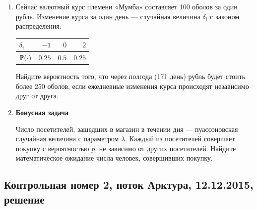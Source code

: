 \begin{enumerate}
\item Сейчас валютный курс племени «Мумба» составляет 100 оболов за один рубль. Изменение курса за один день — случайная величина $\delta_i$ с законом распределения:

\begin{center}
\begin{tabular}{lrrr}
\toprule
$\delta_i$ & $-1$ & $0$ & $2$ \\ \midrule
$\P(\cdot)$ & $0.25$ & $0.5$ & $0.25$ \\
\bottomrule
\end{tabular}
\end{center}

Найдите вероятность того, что через полгода (171 день) рубль будет стоить более 250 оболов, если ежедневные изменения курса происходят независимо друг от друга.

\item \textbf{Бонусная задача}

Число посетителей, зашедших в магазин в течении дня — пуассоновская случайная величина с параметром $\lambda$. Каждый из посетителей совершает покупку с вероятностью $p$, не зависимо от других посетителей. Найдите математическое ожидание числа человек, совершивших покупку.

\end{enumerate}


\subsection{Контрольная номер 2, поток Арктура, 12.12.2015, решение}

